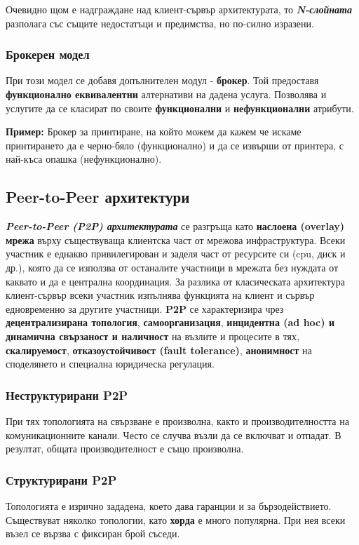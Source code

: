 \documentclass{scrartcl}
\begin{document}
\begin{FlushLeft}
Очевидно щом е надграждане над клиент-сървър архитектурата, то \textbf{\textit{N-слойната}} разполага със същите недостатъци и предимства, но по-силно изразени.

\subsubsection{Брокерен модел}
При този модел се добавя допълнителен модул - \textbf{брокер}.
Той предоставя \textbf{функционално еквивалентни} алтернативи на дадена услуга. 
Позволява и услугите да се класират по своите \textbf{функционални} и \textbf{нефункционални} атрибути.

\textbf{Пример: } Брокер за принтиране, на който можем да кажем че искаме принтирането да е черно-бяло (функционално) 
и да се извърши от принтера, с най-къса опашка (нефункционално).

\subsection{Peer-to-Peer архитектури}

\textbf{\textit{Peer-to-Peer (P2P) архитектурата}} се разгръща като \textbf{наслоена (overlay) мрежа} върху съществуваща клиентска част от мрежова инфраструктура.
Всеки участник е еднакво привилегирован и заделя част от ресурсите си (cpu, диск и др.), която да се използва от останалите участници в мрежата без нуждата от каквато и да е централна координация.
За разлика от класическата архитектура клиент-сървър всеки участник изпълнява функцията на клиент и сървър едновременно за другите участници.
\textbf{P2P} се характеризира чрез \textbf{децентрализирана топология}, \textbf{самоорганизация}, \textbf{инцидентна (ad hoc) и динамична свързаност и наличност} на възлите и процесите в тях, 
\textbf{скалируемост}, \textbf{отказоустойчивост (fault tolerance)}, 
\textbf{анонимност} на споделянето и специална юридическа регулация.

\subsubsection{Неструктурирани P2P}
При тях топологията на свързване е произволна, както и производителността на комуникационните канали.
Често се случва възли да се включват и отпадат. В резултат, общата производителност е също произволна.

\subsubsection{Структурирани P2P}
Топологията е изрично зададена, което дава гаранции и за бързодействието. Съществуват 
няколко топологии, като \textbf{хорда} е много популярна. При нея всеки възел се вързва с фиксиран брой съседи.


\end{FlushLeft}
\end{document}
